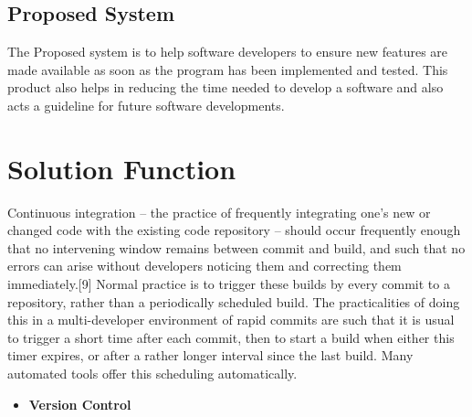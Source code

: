 \documentclass[12pt,a4paper,oneside]{report}
\begin{document}
{\subsection{Proposed System}
\par 
The Proposed system is to help software developers to ensure new features are made
available as soon as the program has been implemented and tested. This product also helps in
reducing the time needed to develop a software and also acts a guideline for future software
developments.
\section{Solution Function}

\par Continuous integration – the practice of frequently integrating one's new or changed code with the existing code repository – should occur frequently enough that no intervening window remains between commit and build, and such that no errors can arise without developers noticing them and correcting them immediately.[9] Normal practice is to trigger these builds by every commit to a repository, rather than a periodically scheduled build. The practicalities of doing this in a multi-developer environment of rapid commits are such that it is usual to trigger a short time after each commit, then to start a build when either this timer expires, or after a rather longer interval since the last build. Many automated tools offer this scheduling automatically.

\begin{itemize}
\item \textbf{Version Control}


\end{itemize}}
\end{document}
